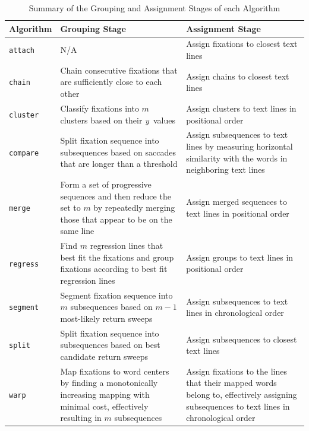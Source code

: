 \documentclass[doc,biblatex]{apa7}
\begin{document}
	\begin{table}
	\begin{center}
	\begin{threeparttable}
	\caption{Summary of the Grouping and Assignment Stages of each Algorithm}
	\begin{tabular}{l p{6.5cm} p{6.5cm}}
	\hline
	Algorithm        & Grouping Stage & Assignment Stage \\ \hline
	\texttt{attach}  & N/A & Assign fixations to closest text lines \\
	\texttt{chain}   & Chain consecutive fixations that are sufficiently close to each other & Assign chains to closest text lines \\
	\texttt{cluster} & Classify fixations into $m$ clusters based on their \textit{y}~values & Assign clusters to text lines in positional order \\
	\texttt{compare} & Split fixation sequence into subsequences based on saccades that are longer than a threshold & Assign subsequences to text lines by measuring horizontal similarity with the words in neighboring text lines \\
	\texttt{merge}   & Form a set of progressive sequences and then reduce the set to $m$ by repeatedly merging those that appear to be on the same line & Assign merged sequences to text lines in positional order \\
	\texttt{regress} & Find $m$ regression lines that best fit the fixations and group fixations according to best fit regression lines & Assign groups to text lines in positional order \\
	\texttt{segment} & Segment fixation sequence into $m$ subsequences based on $m-1$ most-likely return sweeps & Assign subsequences to text lines in chronological order \\
	\texttt{split}   & Split fixation sequence into subsequences based on best candidate return sweeps & Assign subsequences to closest text lines \\
	\texttt{warp}    & Map fixations to word centers by finding a monotonically increasing mapping with minimal cost, effectively resulting in $m$ subsequences & Assign fixations to the lines that their mapped words belong to, effectively assigning subsequences to text lines in chronological order \\ \hline
	\end{tabular}
	\label{table2}
	\end{threeparttable}
	\end{center}
	\end{table}
\end{document}
